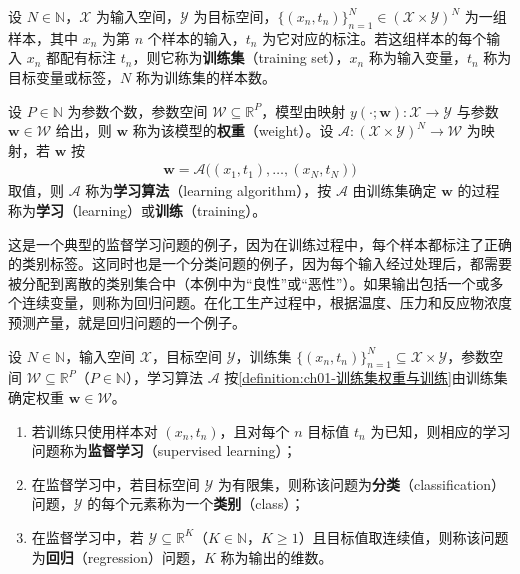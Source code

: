 \documentclass[../../main.tex]{subfiles}
\begin{document}
\begin{definition}\label{definition:ch01-训练集权重与训练}
设 $N\in\mathbb{N}$，$\mathcal{X}$ 为输入空间，$\mathcal{Y}$ 为目标空间，$\{(x_n,t_n)\}_{n=1}^{N}\in(\mathcal{X}\times\mathcal{Y})^{N}$ 为一组样本，其中 $x_n$ 为第 $n$ 个样本的输入，$t_n$ 为它对应的标注。若这组样本的每个输入 $x_n$ 都配有标注 $t_n$，则它称为\textbf{训练集}（training set），$x_n$ 称为输入变量，$t_n$ 称为目标变量或标签，$N$ 称为训练集的样本数。

设 $P\in\mathbb{N}$ 为参数个数，参数空间 $\mathcal{W}\subseteq\mathbb{R}^{P}$，模型由映射 $y(\cdot;\mathbf{w}):\mathcal{X}\to\mathcal{Y}$ 与参数 $\mathbf{w}\in\mathcal{W}$ 给出，则 $\mathbf{w}$ 称为该模型的\textbf{权重}（weight）。设 $\mathcal{A}:(\mathcal{X}\times\mathcal{Y})^{N}\to\mathcal{W}$ 为映射，若 $\mathbf{w}$ 按
\begin{align*}
  \mathbf{w}=\mathcal{A}\bigl((x_1,t_1),\dots,(x_N,t_N)\bigr)
\end{align*}
取值，则 $\mathcal{A}$ 称为\textbf{学习算法}（learning algorithm），按 $\mathcal{A}$ 由训练集确定 $\mathbf{w}$ 的过程称为\textbf{学习}（learning）或\textbf{训练}（training）。
\end{definition}

这是一个典型的监督学习问题的例子，因为在训练过程中，每个样本都标注了正确的类别标签。这同时也是一个分类问题的例子，因为每个输入经过处理后，都需要被分配到离散的类别集合中（本例中为“良性”或“恶性”）。如果输出包括一个或多个连续变量，则称为回归问题。在化工生产过程中，根据温度、压力和反应物浓度预测产量，就是回归问题的一个例子。

\begin{definition}\label{definition:ch01-监督学习分类与回归}
设 $N\in\mathbb{N}$，输入空间 $\mathcal{X}$，目标空间 $\mathcal{Y}$，训练集 $\{(x_n,t_n)\}_{n=1}^{N}\subseteq\mathcal{X}\times\mathcal{Y}$，参数空间 $\mathcal{W}\subseteq\mathbb{R}^{P}$（$P\in\mathbb{N}$），学习算法 $\mathcal{A}$ 按\cref{definition:ch01-训练集权重与训练}由训练集确定权重 $\mathbf{w}\in\mathcal{W}$。
\begin{enumerate}
  \item 若训练只使用样本对 $(x_n,t_n)$，且对每个 $n$ 目标值 $t_n$ 为已知，则相应的学习问题称为\textbf{监督学习}（supervised learning）；
  \item 在监督学习中，若目标空间 $\mathcal{Y}$ 为有限集，则称该问题为\textbf{分类}（classification）问题，$\mathcal{Y}$ 的每个元素称为一个\textbf{类别}（class）；
  \item 在监督学习中，若 $\mathcal{Y}\subseteq\mathbb{R}^{K}$（$K\in\mathbb{N}$，$K\geqslant1$）且目标值取连续值，则称该问题为\textbf{回归}（regression）问题，$K$ 称为输出的维数。
\end{enumerate}
\end{definition}
\end{document}
